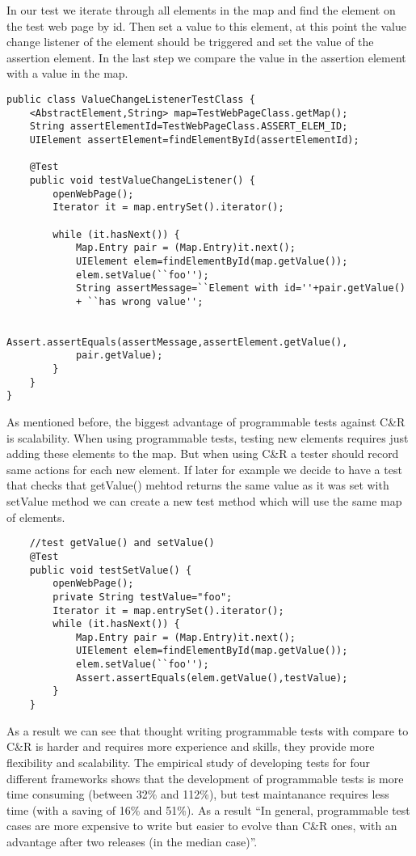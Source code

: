       In our test we iterate through all elements in the map and find the
      element on the test web page by id. Then set a value to this element,
      at this point the value change listener of the element should be triggered and set the value
      of the assertion element. In the last step we compare the value in the
      assertion element with a value in the map.
			
\begin{lstlisting}
public class ValueChangeListenerTestClass {
	<AbstractElement,String> map=TestWebPageClass.getMap();
	String assertElementId=TestWebPageClass.ASSERT_ELEM_ID;
	UIElement assertElement=findElementById(assertElementId);
       
    @Test
    public void testValueChangeListener() {
    	openWebPage();
        Iterator it = map.entrySet().iterator();
          
        while (it.hasNext()) {
        	Map.Entry pair = (Map.Entry)it.next();
        	UIElement elem=findElementById(map.getValue());
        	elem.setValue(``foo'');
        	String assertMessage=``Element with id=''+pair.getValue()
        	+ ``has wrong value'';
        
        	Assert.assertEquals(assertMessage,assertElement.getValue(),
        	pair.getValue);
        }
    }
}
\end{lstlisting}
  
      As mentioned before, the biggest advantage of programmable tests against
      C\&R is scalability. When using programmable tests, testing new elements
      requires just adding these elements to the map. But when using C\&R a
      tester should record same actions for each new element. If later for
      example we decide to have a test that checks that getValue() mehtod
      returns the same value as it was set with setValue method we can create
      a new test method which will use the same map of elements. 

\begin{lstlisting}
	//test getValue() and setValue()
	@Test
	public void testSetValue() {
    	openWebPage();
    	private String testValue="foo";
    	Iterator it = map.entrySet().iterator();
    	while (it.hasNext()) {
    		Map.Entry pair = (Map.Entry)it.next();
			UIElement elem=findElementById(map.getValue());
            elem.setValue(``foo'');  
            Assert.assertEquals(elem.getValue(),testValue);        
        }
    }
\end{lstlisting}

      As a result we can see that thought writing programmable tests with
      compare to C\&R is harder and requires more experience and skills, they
      provide more flexibility and scalability. The empirical study
       of developing tests for four different frameworks shows that the development of programmable tests is more time
      consuming (between 32\% and 112\%), but test maintanance requires less
      time (with a saving of 16\% and 51\%). As a result ``In general, programmable test cases are more
	expensive to write but easier to evolve than C\&R ones, with an advantage after
	two releases (in the median case)''.\cite{CaptureReplay7}

